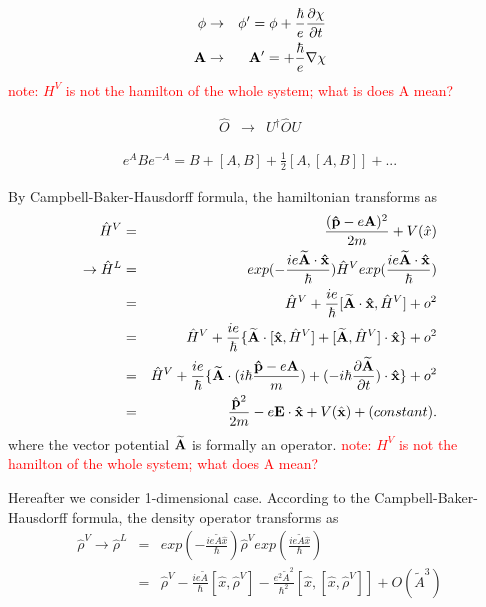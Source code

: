 \documentclass[aps,prb,preprint]{revtex4-1}
\begin{document}
\begin{appendix}
\begin{eqnarray}
\phi &\rightarrow& \phi' = \phi +\frac{\hbar}{e} \frac{\partial \chi}{\partial t} \\
{\bf A} &\rightarrow& {\bf A}' = +\frac{\hbar}{e} {\bf \nabla} \chi
\end{eqnarray} 
\textcolor{red}{note: $H^V$ is not the hamilton of the whole system; what is does A mean?}

\begin{eqnarray}
\hat{O} &\rightarrow& U^{\dag} \hat{O} U \nonumber 
\end{eqnarray} 

\begin{eqnarray}
e^A B e^{-A} = B+ [A,B] +\frac{1}{2}[A,[A,B]] + ... \nonumber  
\end{eqnarray} 

By Campbell-Baker-Hausdorff formula, the hamiltonian transforms as  
\begin{eqnarray}
\hat{H}^V &=& \frac{ ({\bf \hat{p}} - e{\bf A})^2 }{2m} + V(\hat{x}) \nonumber \nonumber \\ 
\rightarrow \hat{H}^L &=& exp(-\frac{ i e {\bf \widetilde{A} \cdot \hat{x}} }{\hbar}) \hat{H}^V exp( \frac{ i e {\bf \widetilde{A} \cdot \hat{x}}}{\hbar}) \nonumber \\
&=& \hat{H}^V + \frac{i e}{\hbar}[{\bf \widetilde{A} \cdot \hat{x} }, \hat{H}^V] + o^2 \nonumber \\
&=& \hat{H}^V + \frac{i e}{\hbar} \{ {\bf \widetilde{A}} \cdot [ {\bf \hat{x} }, \hat{H}^V] + [ {\bf \widetilde{A}} , \hat{H}^V] \cdot {\bf \hat{x} } \}+ o^2 \nonumber \\
&=& \hat{H}^V + \frac{i e}{\hbar} \{ {\bf \widetilde{A}} \cdot (i \hbar \frac{{\bf \hat{p}} - e{\bf A}}{m}) + (- i \hbar \frac{\partial \widetilde{\bf A}}{\partial t}) \cdot {\bf \hat{x} } \}+ o^2 \nonumber \\
&=& \frac{ \hat{\bf p}^2 }{2m} -e {\bf E \cdot \hat{\bf x}} + V(\hat{\bf x})+ (constant).\nonumber \\
\end{eqnarray} 
where the vector potential ${\bf \widetilde{A}}$ is formally an operator. 
\textcolor{red}{note: $H^V$ is not the hamilton of the whole system; what does A mean?}

Hereafter we consider 1-dimensional case.
According to the Campbell-Baker-Hausdorff formula, the density operator transforms as 
\begin{eqnarray}
\hat{\rho}^V \rightarrow \hat{\rho}^L &=& exp(-\frac{ i e \widetilde{A} \hat{x} }{\hbar}) \hat{\rho}^V exp(\frac{ i e \widetilde{A} \hat{x} }{\hbar})\nonumber \\
&=& \hat{\rho}^V -\frac{ i e \widetilde{A}}{\hbar} [\hat{x}, \hat{\rho}^V ] - \frac{ e^2 \widetilde{A}^2}{\hbar^2} [ \hat{x}, [\hat{x}, \hat{\rho}^V ] ]+ O(\widetilde{A}^3)
\end{eqnarray} 
\fi


\end{appendix}
\end{document}

